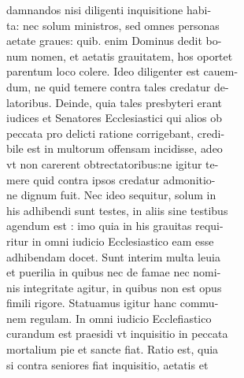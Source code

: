 \documentclass{article}
\begin{document}
\begin{pages}
                damnandos nisi diligenti inquisitione habi- \\
                ta: nec solum ministros, sed omnes personas \\
                aetate graues: quib. enim Dominus dedit bo- \\
                num nomen, et aetatis grauitatem, hos oportet \\
                parentum loco colere. Ideo diligenter est cauem- \\
                dum, ne quid temere contra tales credatur de- \\
                latoribus. Deinde, quia tales presbyteri erant \\
                iudices et Senatores Ecclesiastici qui alios ob \\
                peccata pro delicti ratione corrigebant, credi- \\
                bile est in multorum offensam incidisse, adeo \\
                vt non carerent obtrectatoribus:ne igitur te- \\
                mere quid contra ipsos credatur admonitio- \\
                ne dignum fuit. Nec ideo sequitur, solum in \\
                his adhibendi sunt testes, in aliis sine testibus \\
                agendum est : imo quia in his grauitas requi- \\
                ritur in omni iudicio Ecclesiastico eam esse \\
                adhibendam docet. Sunt interim multa leuia \\
                et puerilia in quibus nec de famae nec nomi- \\
                nis integritate agitur, in quibus non est opus \\
                fimili rigore. Statuamus igitur hanc commu- \\
                nem regulam. In omni iudicio Ecclefiastico \\
                curandum est praesidi vt inquisitio in peccata \\
                mortalium pie et sancte fiat. Ratio est, quia \\
                si contra seniores fiat inquisitio, aetatis et \\

\end{pages}
\end{document}
